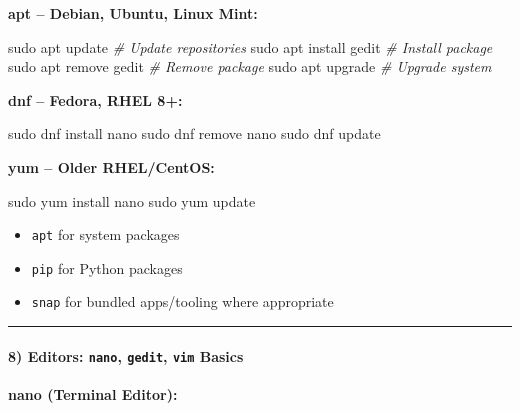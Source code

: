 \documentclass[
  english,
  paper=a4,
  oneside  ,captions=tableheading
]{scrartcl}
\newenvironment{Shaded}{}{}
\newcommand{\CommentTok}[1]{\textcolor[rgb]{0.38,0.63,0.69}{\textit{#1}}}
\newcommand{\FunctionTok}[1]{\textcolor[rgb]{0.02,0.16,0.49}{#1}}
\newcommand{\NormalTok}[1]{#1}
\providecommand{\tightlist}{%
  \setlength{\itemsep}{0pt}\setlength{\parskip}{0pt}}
\begin{document}
\textbf{apt -- Debian, Ubuntu, Linux Mint:}

\begin{Shaded}
\begin{Highlighting}[]
\FunctionTok{sudo}\NormalTok{ apt update             }\CommentTok{\# Update repositories}
\FunctionTok{sudo}\NormalTok{ apt install gedit      }\CommentTok{\# Install package}
\FunctionTok{sudo}\NormalTok{ apt remove gedit       }\CommentTok{\# Remove package}
\FunctionTok{sudo}\NormalTok{ apt upgrade            }\CommentTok{\# Upgrade system}
\end{Highlighting}
\end{Shaded}

\textbf{dnf -- Fedora, RHEL 8+:}

\begin{Shaded}
\begin{Highlighting}[]
\FunctionTok{sudo}\NormalTok{ dnf install nano}
\FunctionTok{sudo}\NormalTok{ dnf remove nano}
\FunctionTok{sudo}\NormalTok{ dnf update}
\end{Highlighting}
\end{Shaded}

\textbf{yum -- Older RHEL/CentOS:}

\begin{Shaded}
\begin{Highlighting}[]
\FunctionTok{sudo}\NormalTok{ yum install nano}
\FunctionTok{sudo}\NormalTok{ yum update}
\end{Highlighting}
\end{Shaded}

\begin{itemize}
\tightlist
\item
  \texttt{apt} for system packages
\item
  \texttt{pip} for Python packages
\item
  \texttt{snap} for bundled apps/tooling where appropriate
\end{itemize}

\begin{center}\rule{0.5\linewidth}{0.5pt}\end{center}

\paragraph{\texorpdfstring{8) Editors: \texttt{nano}, \texttt{gedit},
\texttt{vim}
Basics}{8) Editors: nano, gedit, vim Basics}}\label{editors-nano-gedit-vim-basics}

\textbf{nano (Terminal Editor):}
\end{document}
